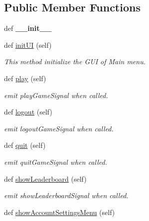 \subsection*{Public Member Functions}
\begin{DoxyCompactItemize}
\item 
\hypertarget{classsrc_1_1main__menu_1_1_main_menu_a138987af797121617841ccb0cdd20121}{}def {\bfseries \+\_\+\+\_\+init\+\_\+\+\_\+}\label{classsrc_1_1main__menu_1_1_main_menu_a138987af797121617841ccb0cdd20121}

\item 
def \hyperlink{classsrc_1_1main__menu_1_1_main_menu_abe71c56b747e1f76a2b73b542875a4d7}{init\+U\+I} (self)
\begin{DoxyCompactList}\small\item\em This method initialize the G\+U\+I of Main menu. \end{DoxyCompactList}\item 
def \hyperlink{classsrc_1_1main__menu_1_1_main_menu_adaa5ceb3caccddfacf97ca9befd21ae5}{play} (self)
\begin{DoxyCompactList}\small\item\em emit play\+Game\+Signal when called. \end{DoxyCompactList}\item 
def \hyperlink{classsrc_1_1main__menu_1_1_main_menu_ac60fcc9e2384edbf984c094682c61624}{logout} (self)
\begin{DoxyCompactList}\small\item\em emit logout\+Game\+Signal when called. \end{DoxyCompactList}\item 
def \hyperlink{classsrc_1_1main__menu_1_1_main_menu_ab2872e528109b4747bc169235302d3ae}{quit} (self)
\begin{DoxyCompactList}\small\item\em emit quit\+Game\+Signal when called. \end{DoxyCompactList}\item 
def \hyperlink{classsrc_1_1main__menu_1_1_main_menu_ad92f678a32751ee9d592fd64d487126b}{show\+Leaderboard} (self)
\begin{DoxyCompactList}\small\item\em emit show\+Leaderboard\+Signal when called. \end{DoxyCompactList}\item 
\hypertarget{classsrc_1_1main__menu_1_1_main_menu_a9f5509f22d8daa7510daa6bb592e5f73}{}def \hyperlink{classsrc_1_1main__menu_1_1_main_menu_a9f5509f22d8daa7510daa6bb592e5f73}{show\+Account\+Settings\+Menu} (self)\label{classsrc_1_1main__menu_1_1_main_menu_a9f5509f22d8daa7510daa6bb592e5f73}


\end{DoxyCompactItemize}
